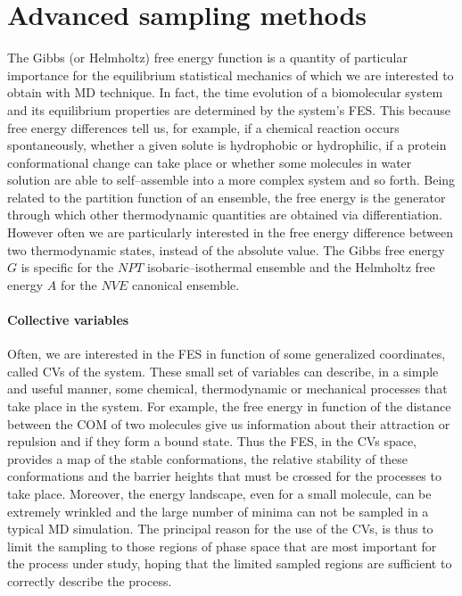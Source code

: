 \section{Advanced sampling methods}
The Gibbs (or Helmholtz) free energy function is a quantity of particular importance for the equilibrium
statistical mechanics of which we are interested to obtain with \ac{MD} technique. In fact, the time evolution of
a biomolecular system and its equilibrium properties are determined by the system's \ac{FES}. This because free
energy differences tell us, for example, if a chemical reaction occurs spontaneously, whether a given solute is
hydrophobic or hydrophilic, if a protein conformational change can take place or whether some molecules in water
solution are able to self--assemble into a more complex system and so forth. Being related to the partition
function of an ensemble, the free energy is the generator through which other thermodynamic quantities are
obtained via differentiation. However often we are particularly interested in the free energy difference between
two thermodynamic states, instead of the absolute value. The Gibbs free energy $G$ is specific for the $NPT$
isobaric--isothermal ensemble and the Helmholtz free energy $A$ for the $NVE$ canonical ensemble.

\paragraph{\textbf{Collective variables}} Often, we are interested in the \ac{FES} in function of some
generalized coordinates, called \acp{CV} of the system. These small set of variables can describe, in a simple
and useful manner, some chemical, thermodynamic or mechanical processes that take place in the system. For
example, the free energy in function of the distance between the \ac{COM} of two molecules give us information
about their attraction or repulsion and if they form a bound state. Thus the \ac{FES}, in the \acp{CV} space,
provides a map of the stable conformations, the relative stability of these conformations and the barrier heights
that must be crossed for the processes to take place. Moreover, the energy landscape, even for a small molecule,
can be extremely wrinkled and the large number of minima can not be sampled in a typical \ac{MD} simulation. The
principal reason for the use of the \acp{CV}, is thus to limit the sampling to those regions of phase space that
are most important for the process under study, hoping that the limited sampled regions are sufficient to
correctly describe the process.

